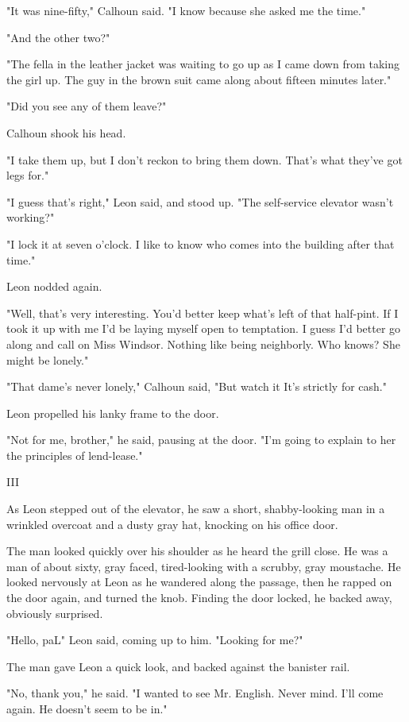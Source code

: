 \documentclass{novel}
\begin{document}
"It was nine-fifty," Calhoun said. "I know because she asked me the time."

"And the other two?"

"The fella in the leather jacket was waiting to go up as I came down from taking the girl up. The guy in the brown suit came along about fifteen minutes later."

"Did you see any of them leave?"

Calhoun shook his head.

"I take them up, but I don't reckon to bring them down. That's what they've got legs for."

"I guess that's right," Leon said, and stood up. "The self-service elevator wasn't working?"

"I lock it at seven o'clock. I like to know who comes into the building after that time."

Leon nodded again.

"Well, that's very interesting. You'd better keep what's left of that half-pint. If I took it up with me I'd be laying myself open to temptation. I guess I'd better go along and call on Miss Windsor. Nothing like being neighborly. Who knows? She might be lonely."

"That dame's never lonely," Calhoun said, "But watch it It's strictly for cash."

Leon propelled his lanky frame to the door.

"Not for me, brother," he said, pausing at the door. "I'm going to explain to her the principles of lend-lease."



III

As Leon stepped out of the elevator, he saw a short, shabby-looking man in a wrinkled overcoat and a dusty gray hat, knocking on his office door.

The man looked quickly over his shoulder as he heard the grill close. He was a man of about sixty, gray faced, tired-looking with a scrubby, gray moustache. He looked nervously at Leon as he wandered along the passage, then he rapped on the door again, and turned the knob. Finding the door locked, he backed away, obviously surprised.

"Hello, paL" Leon said, coming up to him. "Looking for me?"

The man gave Leon a quick look, and backed against the banister rail.

"No, thank you," he said. "I wanted to see Mr. English. Never mind. I'll come again. He doesn't seem to be in."
\end{document}
